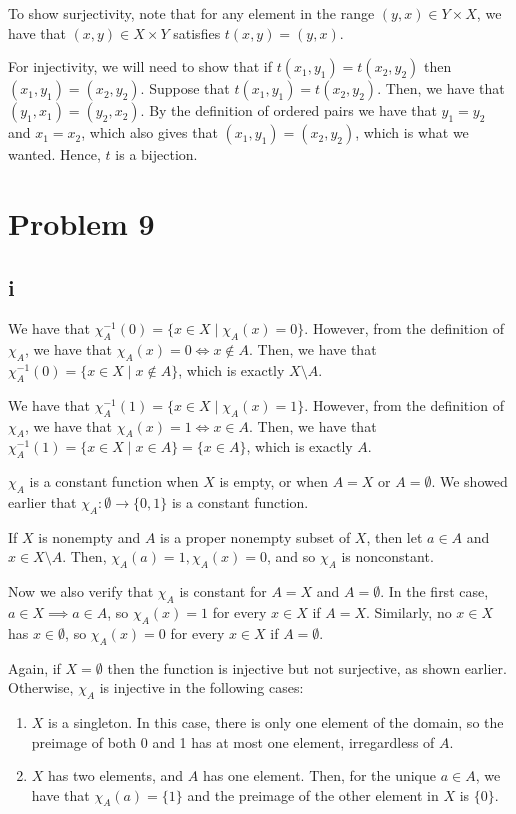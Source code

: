 \documentclass[12pt,letterpaper]{article}
\theoremstyle{definition}
\begin{document}
{To show surjectivity, note that for any element in the range $(y,x) \in Y \times
X$, we have that $(x,y) \in X \times Y$ satisfies $t(x,y) =
(y,x)$.

For injectivity, we will need to show that if $t(x_1,y_1) = t(x_2,y_2)$ then
$(x_1,y_1) = (x_2,y_2)$. Suppose that $t(x_1,y_1) = t(x_2,y_2)$. Then, we have
that $(y_1, x_1) = (y_2, x_2)$. By the definition of ordered pairs we have that
$y_1 = y_2$ and $x_1 = x_2$, which also gives that $(x_1,y_1) = (x_2,y_2)$,
which is what we wanted. Hence, $t$ is a bijection.

\section*{Problem 9}
\subsection*{i}

We have that $\chi_A^{-1}(0) = \{x \in X \mid \chi_A(x) = 0\}$. However, from
the definition of $\chi_A$, we have that $\chi_A(x) = 0 \iff x \notin A$. Then,
we have that $\chi_A^{-1}(0) = \{x \in X \mid x \notin A\}$, which is exactly $X
\setminus A$.

We have that $\chi_A^{-1}(1) = \{x \in X \mid \chi_A(x) = 1\}$. However, from
the definition of $\chi_A$, we have that $\chi_A(x) = 1 \iff x \in A$. Then,
we have that $\chi_A^{-1}(1) = \{x \in X \mid x \in A\} = \{x \in A\}$, which is
exactly $A$.

$\chi_A$ is a constant function when $X$ is empty, or when $A = X$ or $A =
\emptyset$. We showed
earlier that $\chi_A: \emptyset \rightarrow \{0,1\}$ is a constant function.

If $X$ is nonempty and $A$ is a proper nonempty subset of $X$, then let $a \in
A$ and $x \in X \setminus A$. Then, $\chi_A(a) = 1, \chi_A(x) = 0$, and so
$\chi_A$ is nonconstant.

Now we also verify that $\chi_A$ is constant for $A = X$ and $A = \emptyset$. In the first
case, $a \in X \implies a\in A$, so $\chi_A(x) = 1$ for every $x \in X$ if $A =
X$. Similarly, no $x \in X$ has $x \in \emptyset$, so $\chi_A(x) = 0$ for every $x
\in X$ if $A = \emptyset$.

Again, if $X = \emptyset$ then the function is injective but not surjective, as
shown earlier. Otherwise, $\chi_A$ is injective in the following cases:
\begin{enumerate}
  \item $X$ is a singleton. In this case, there is only one element of the domain, so
  the preimage of both 0 and 1 has at most one element, irregardless of $A$.
  \item $X$ has two elements, and $A$ has one element. Then, for the unique $a
    \in A$, we have that $\chi_A(a) = \{1\}$ and the preimage of the other
    element in $X$ is $\{0\}$.
\end{enumerate}

}
\end{document}
